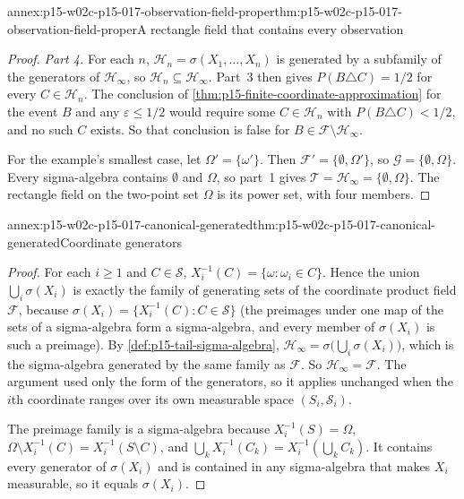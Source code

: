 \begin{annexitem}{annex:p15-w02c-p15-017-observation-field-proper}{thm:p15-w02c-p15-017-observation-field-proper}{A rectangle field that contains every observation}
\begin{proof}
\emph{Part 4.} For each \(n\), \(\mathcal H_n=\sigma(X_1,\ldots,X_n)\) is
generated by a subfamily of the generators of \(\mathcal H_\infty\), so
\(\mathcal H_n\subseteq\mathcal H_\infty\). Part~3 then gives
\(P(B\triangle C)=1/2\) for every \(C\in\mathcal H_n\). The conclusion of
\cref{thm:p15-finite-coordinate-approximation} for the event \(B\) and
any \(\varepsilon\leq1/2\) would require some \(C\in\mathcal H_n\) with
\(P(B\triangle C)<1/2\), and no such \(C\) exists. So that conclusion is
false for \(B\in\mathcal F\setminus\mathcal H_\infty\).

For the example's smallest case, let \(\Omega'=\{\omega'\}\). Then
\(\mathcal F'=\{\emptyset,\Omega'\}\), so
\(\mathcal G=\{\emptyset,\Omega\}\). Every sigma-algebra contains
\(\emptyset\) and \(\Omega\), so part~1 gives
\(\mathcal T=\mathcal H_\infty=\{\emptyset,\Omega\}\). The rectangle field
on the two-point set \(\Omega\) is its power set, with four members.
\end{proof}
\end{annexitem}

\begin{annexitem}{annex:p15-w02c-p15-017-canonical-generated}{thm:p15-w02c-p15-017-canonical-generated}{Coordinate generators}
\begin{proof}
For each \(i\geq1\) and \(C\in\mathcal S\),
\(X_i^{-1}(C)=\{\omega:\omega_i\in C\}\). Hence the union
\(\bigcup_i\sigma(X_i)\) is exactly the family of generating sets of the
coordinate product field \(\mathcal F\), because
\(\sigma(X_i)=\{X_i^{-1}(C):C\in\mathcal S\}\) (the preimages under one
map of the sets of a sigma-algebra form a sigma-algebra, and every
member of \(\sigma(X_i)\) is such a preimage). By
\cref{def:p15-tail-sigma-algebra},
\(\mathcal H_\infty=\sigma\bigl(\bigcup_i\sigma(X_i)\bigr)\), which is the
sigma-algebra generated by the same family as \(\mathcal F\). So
\(\mathcal H_\infty=\mathcal F\). The argument used only the form of
the generators, so it applies unchanged when the \(i\)th coordinate
ranges over its own measurable space \((S_i,\mathcal S_i)\).

The preimage family is a sigma-algebra because
\(X_i^{-1}(S)=\Omega\),
\(\Omega\setminus X_i^{-1}(C)=X_i^{-1}(S\setminus C)\), and
\(\bigcup_kX_i^{-1}(C_k)=X_i^{-1}(\bigcup_kC_k)\). It contains every
generator of \(\sigma(X_i)\) and is contained in any sigma-algebra that
makes \(X_i\) measurable, so it equals \(\sigma(X_i)\).
\end{proof}
\end{annexitem}
